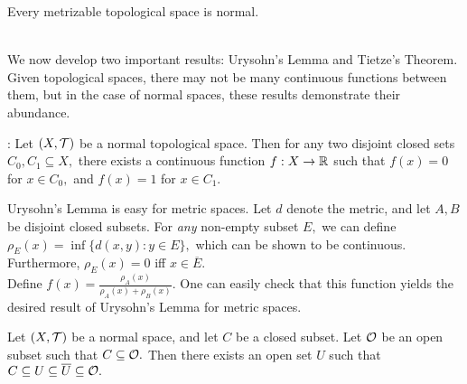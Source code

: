\begin{prop}
Every metrizable topological space is normal. \\ \\
\end{prop}

\noindent We now develop two important results: Urysohn's Lemma and Tietze's Theorem. Given topological spaces, there may not be many continuous functions between them, but in the case of normal spaces, these results demonstrate their abundance.

\begin{frame*}
\noindent{}: Let $(X,\mathcal{T})$ be a normal topological space. Then for any two disjoint closed sets $C_0,C_1\subseteq X,$ there exists a continuous function $f:X\rightarrow\mathbb{R}^{}$ such that $f(x)=0$ for $x\in C_0,$ and $f(x)=1$ for $x\in C_1.$
\end{frame*}

\noindent Urysohn's Lemma is easy for metric spaces. Let $d$ denote the metric, and let $A,B$ be disjoint closed subsets. For \textit{any} non-empty subset $E,$ we can define $\rho_E(x)=\inf\{d(x,y):y\in E\},$ which can be shown to be continuous. Furthermore, $\rho_E(x)=0$ iff $x\in \overline{E}.$ \\
Define $\displaystyle f(x)=\frac{\rho_{A}(x)}{\rho_A(x)+\rho_B(x)}.$ One can easily check that this function yields the desired result of Urysohn's Lemma for metric spaces.

\begin{lemma}
Let $(X,\mathcal{T})$ be a normal space, and let $C$ be a closed subset. Let $\mathcal{O}$ be an open subset such that $C\subseteq\mathcal{O}.$ Then there exists an open set $U$ such that $C\subseteq U\subseteq \overline{U}\subseteq \mathcal{O}.$ \\ \\
\end{lemma}

